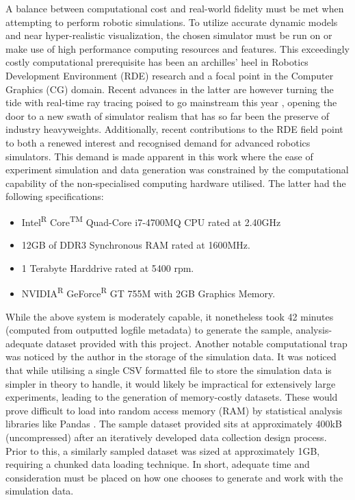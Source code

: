 \documentclass{report}
\begin{document}
A balance between computational cost and real-world fidelity must be met when attempting to perform robotic simulations. To utilize accurate dynamic models and near hyper-realistic visualization, the chosen simulator must be run on or make use of high performance computing resources and features. This exceedingly costly computational prerequisite has been an archilles' heel in Robotics Development Environment (RDE) research and a focal point in the Computer Graphics (CG) domain. Recent advances in the latter are however turning the tide with real-time ray tracing poised to go mainstream this year \cite{RTracing}, opening the door to a new swath of simulator realism that has so far been the preserve of industry heavyweights. Additionally, recent contributions to the RDE field \cite{Shah2018} point to both a renewed interest and recognised demand for advanced robotics simulators. This demand is made apparent in this work where the ease of experiment simulation and data generation was constrained by the computational capability of the non-specialised computing hardware utilised. The latter had the following specifications:
\begin{itemize}
	\item Intel\textsuperscript{R} Core\textsuperscript{TM} Quad-Core i7-4700MQ CPU rated at 2.40GHz
	\item 12GB of DDR3 Synchronous RAM rated at 1600MHz.
	\item 1 Terabyte Harddrive rated at 5400 rpm.
	\item NVIDIA\textsuperscript{R} GeForce\textsuperscript{R} GT 755M with 2GB Graphics Memory.
\end{itemize}

While the above system is moderately capable, it nonetheless took 42 minutes (computed from outputted logfile metadata) to generate the sample, analysis-adequate dataset provided with this project. Another notable computational trap was noticed by the author in the storage of the simulation data. It was noticed that while utilising a single CSV formatted file to store the simulation data is simpler in theory to handle, it would likely be impractical for extensively large experiments, leading to the generation of memory-costly datasets. These would prove difficult to load into random access memory (RAM) by statistical analysis libraries like Pandas \cite{Pandas}. The sample dataset provided sits at approximately 400kB (uncompressed) after an iteratively developed data collection design process. Prior to this, a similarly sampled dataset was sized at approximately 1GB, requiring a chunked data loading technique. In short, adequate time and consideration must be placed on how one chooses to generate and work with the simulation data.
\end{document}
